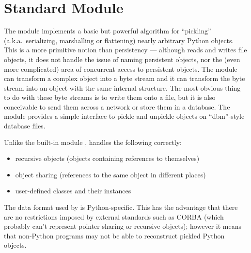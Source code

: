 \section{Standard Module }

\renewcommand{\indexsubitem}{(in module pickle)}

The  module implements a basic but powerful algorithm for
``pickling'' (a.k.a.\ serializing, marshalling or flattening) nearly
arbitrary Python objects.  This is a more primitive notion than
persistency --- although  reads and writes file objects,
it does not handle the issue of naming persistent objects, nor the
(even more complicated) area of concurrent access to persistent
objects.  The  module can transform a complex object into
a byte stream and it can transform the byte stream into an object with
the same internal structure.  The most obvious thing to do with these
byte streams is to write them onto a file, but it is also conceivable
to send them across a network or store them in a database.  The module
 provides a simple interface to pickle and unpickle
objects on ``dbm''-style database files.

Unlike the built-in module ,  handles the
following correctly:

\begin{itemize}

\item recursive objects (objects containing references to themselves)

\item object sharing (references to the same object in different places)

\item user-defined classes and their instances

\end{itemize}

The data format used by  is Python-specific.  This has
the advantage that there are no restrictions imposed by external
standards such as CORBA (which probably can't represent pointer
sharing or recursive objects); however it means that non-Python
programs may not be able to reconstruct pickled Python objects.

